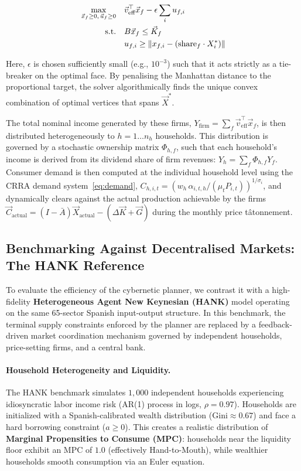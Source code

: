 \begin{align}\label{eq:firm_lp}
\max_{\vec{x}_f \geq 0,\, \vec{u}_f \ge 0} &\quad \vec{v}_{\text{eff}}^\top \vec{x}_f - \epsilon \sum_i u_{f,i} \\
\text{s.t.} &\quad B \vec{x}_f \leq \vec{K}_f \notag\\
            &\quad u_{f,i} \geq \| x_{f,i} - (\text{share}_f \cdot X^*_i) \| \notag\\
\end{align}

Here, $\epsilon$ is chosen sufficiently small (e.g., $10^{-3}$) such that it acts strictly as a tie-breaker on the optimal face. By penalising the Manhattan distance to the proportional target, the solver algorithmically finds the unique convex combination of optimal vertices that spans $\vec{X}^*$.

The total nominal income generated by these firms, $Y_{\text{firm}} = \sum_f \vec{v}_{\text{eff}}^\top \vec{x}_f$, is then distributed heterogeneously to $h = 1 \dots n_h$ households. This distribution is governed by a stochastic ownership matrix $\Phi_{h,f}$, such that each household's income is derived from its dividend share of firm revenues: $Y_h = \sum_f \Phi_{h,f} Y_f$. Consumer demand is then computed at the individual household level using the CRRA demand system~\eqref{eq:demand},
$C_{h,i,t} = (w_h\,\alpha_{i,t,h}/(\mu_t P_{i,t}))^{1/\sigma_i}$,
and dynamically clears against the actual production achievable by the firms $\vec{C}_{\text{actual}} = (I-\bar{A})\vec{X}_{\text{actual}} - (\Delta \vec{K} + \vec{G})$ during the monthly price tâtonnement.

\subsection{Benchmarking Against Decentralised Markets: The HANK Reference}
\label{subsec:hank_benchmark}

To evaluate the efficiency of the cybernetic planner, we contrast it with a high-fidelity \textbf{Heterogeneous Agent New Keynesian (HANK)} model operating on the same 65-sector Spanish input-output structure. In this benchmark, the terminal supply constraints enforced by the planner are replaced by a feedback-driven market coordination mechanism governed by independent households, price-setting firms, and a central bank.

\paragraph{Household Heterogeneity and Liquidity.}
The HANK benchmark simulates $1{,}000$ independent households experiencing idiosyncratic labor income risk (AR(1) process in logs, $\rho = 0.97$). Households are initialized with a Spanish-calibrated wealth distribution ($\text{Gini} \approx 0.67$) and face a hard borrowing constraint ($a \geq 0$). This creates a realistic distribution of \textbf{Marginal Propensities to Consume (MPC)}: households near the liquidity floor exhibit an MPC of $1.0$ (effectively Hand-to-Mouth), while wealthier households smooth consumption via an Euler equation.

